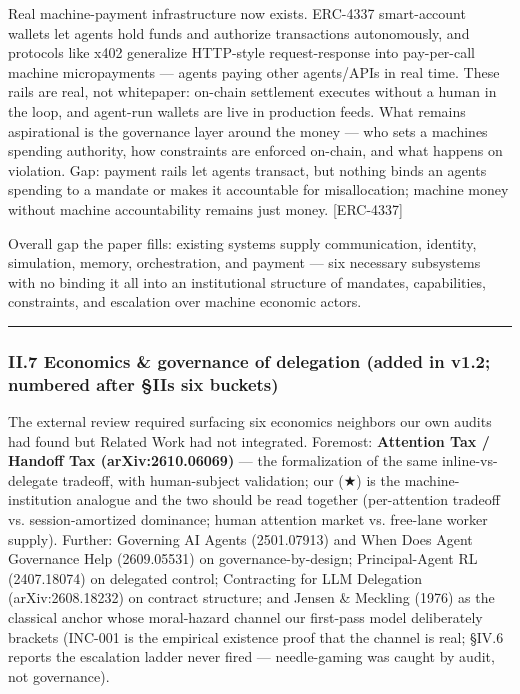 \documentclass[
]{article}
\begin{document}
Real machine-payment infrastructure now exists. ERC-4337 smart-account
wallets let agents hold funds and authorize transactions autonomously,
and protocols like x402 generalize HTTP-style request-response into
pay-per-call machine micropayments --- agents paying other agents/APIs
in real time. These rails are real, not whitepaper: on-chain settlement
executes without a human in the loop, and agent-run wallets are live in
production feeds. What remains aspirational is the governance layer
around the money --- who sets a machine\textquotesingle s spending
authority, how constraints are enforced on-chain, and what happens on
violation. Gap: payment rails let agents transact, but nothing binds an
agent\textquotesingle s spending to a mandate or makes it accountable
for misallocation; machine money without machine accountability remains
just money. {[}ERC-4337{]}

Overall gap the paper fills: existing systems supply communication,
identity, simulation, memory, orchestration, and payment --- six
necessary subsystems with no binding it all into an institutional
structure of mandates, capabilities, constraints, and escalation over
machine economic actors.

\begin{center}\rule{0.5\linewidth}{0.5pt}\end{center}

\subsubsection{II.7 Economics \& governance of delegation (added in
v1.2; numbered after §II\textquotesingle s six
buckets)}\label{ii7-economics--governance-of-delegation-added-in-v12-numbered-after-iis-six-buckets}

The external review required surfacing six economics neighbors our own
audits had found but Related Work had not integrated. Foremost:
\textbf{Attention Tax / Handoff Tax (arXiv:2610.06069)} --- the
formalization of the same inline-vs-delegate tradeoff, with
human-subject validation; our (★) is the machine-institution analogue
and the two should be read together (per-attention tradeoff vs.
session-amortized dominance; human attention market vs. free-lane worker
supply). Further: Governing AI Agents (2501.07913) and When Does Agent
Governance Help (2609.05531) on governance-by-design; Principal-Agent RL
(2407.18074) on delegated control; Contracting for LLM Delegation
(arXiv:2608.18232) on contract structure; and Jensen \& Meckling (1976)
as the classical anchor whose moral-hazard channel our first-pass model
deliberately brackets (INC-001 is the empirical existence proof that the
channel is real; §IV.6 reports the escalation ladder never fired ---
needle-gaming was caught by audit, not governance).
\end{document}
